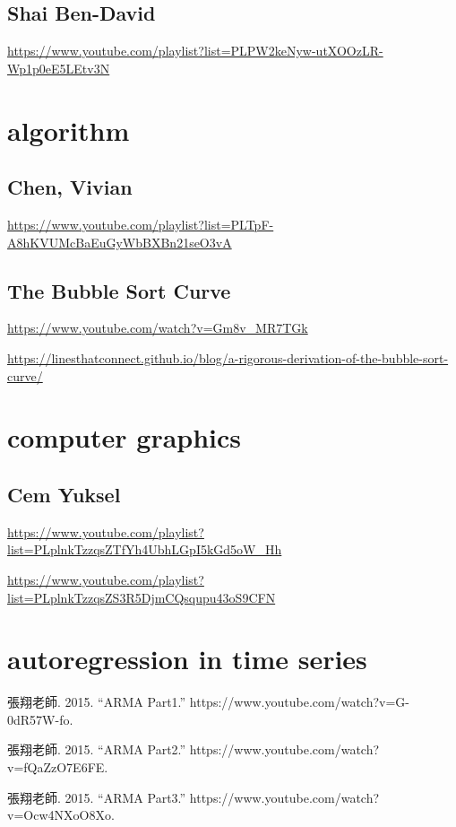 \documentclass[
]{book}
\theoremstyle{definition}
\theoremstyle{definition}
\theoremstyle{definition}
\theoremstyle{definition}
\theoremstyle{remark}
\begin{document}
\section{Shai Ben-David}\label{shai-ben-david-1}

\url{https://www.youtube.com/playlist?list=PLPW2keNyw-utXOOzLR-Wp1p0eE5LEtv3N}

\chapter{algorithm}\label{algorithm}

\section{Chen, Vivian}\label{chen-vivian}

\url{https://www.youtube.com/playlist?list=PLTpF-A8hKVUMcBaEuGyWbBXBn21seO3vA}

\section{The Bubble Sort Curve}\label{the-bubble-sort-curve}

\url{https://www.youtube.com/watch?v=Gm8v_MR7TGk}

\url{https://linesthatconnect.github.io/blog/a-rigorous-derivation-of-the-bubble-sort-curve/}

\chapter{computer graphics}\label{computer-graphics}

\section{Cem Yuksel}\label{cem-yuksel}

\url{https://www.youtube.com/playlist?list=PLplnkTzzqsZTfYh4UbhLGpI5kGd5oW_Hh}

\url{https://www.youtube.com/playlist?list=PLplnkTzzqsZS3R5DjmCQsqupu43oS9CFN}

\chapter{autoregression in time series}\label{autoregression-in-time-series}

\begin{CJK}{UTF8}{bsmi}
張翔老師. 2015. “ARMA Part1.” https://www.youtube.com/watch?v=G-0dR57W-fo.

張翔老師. 2015. “ARMA Part2.” https://www.youtube.com/watch?v=fQaZzO7E6FE.

張翔老師. 2015. “ARMA Part3.” https://www.youtube.com/watch?v=Ocw4NXoO8Xo.
\end{CJK}
\end{document}
